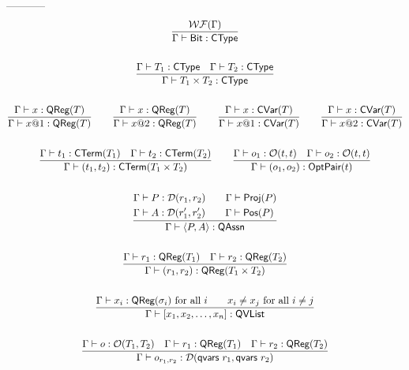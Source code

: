 -----------
\begin{gather*}
    \frac{\mathcal{WF}(\Gamma)}{\Gamma \vdash \textsf{Bit} : \textsf{CType}}
    \\
    \\
    \frac{\Gamma \vdash T_1 : \textsf{CType} \quad \Gamma \vdash T_2 : \textsf{CType}}{\Gamma \vdash T_1 \times T_2 : \textsf{CType}} \\
    \\
    \frac{\Gamma \vdash x : \textsf{QReg}(T)}{\Gamma \vdash x@1 : \textsf{QReg}(T)}
    \qquad
    \frac{\Gamma \vdash x : \textsf{QReg}(T)}{\Gamma \vdash x@2 : \textsf{QReg}(T)}
    \qquad
    \frac{\Gamma \vdash x : \textsf{CVar}(T)}{\Gamma \vdash x@1 : \textsf{CVar}(T)}
    \qquad
    \frac{\Gamma \vdash x : \textsf{CVar}(T)}{\Gamma \vdash x@2 : \textsf{CVar}(T)}
    \\
    \\
    \frac{
    \Gamma \vdash t_1 : \textsf{CTerm}(T_1) \quad \Gamma \vdash t_2 : \textsf{CTerm}(T_2)
    }
    {\Gamma \vdash (t_1, t_2) : \textsf{CTerm}(T_1 \times T_2)}
    \qquad
    \frac{\Gamma \vdash o_1 : \mathcal{O}(t, t) \quad \Gamma \vdash o_2 : \mathcal{O}(t, t)}{\Gamma \vdash (o_1, o_2) : \textsf{OptPair}(t)} \\
    \\
    \frac{
        \begin{aligned}
            & \Gamma \vdash P : \mathcal{D}(r_1, r_2) \qquad \Gamma \vdash \textsf{Proj}({P}) \\
            & \Gamma \vdash A : \mathcal{D}(r_1', r_2') \qquad \Gamma \vdash \textsf{Pos}({P})
        \end{aligned}
    }{\Gamma \vdash \langle P, A \rangle : \textsf{QAssn}} \\
    \\
    \frac{\Gamma \vdash r_1 : \textsf{QReg}(T_1) \quad \Gamma \vdash r_2 : \textsf{QReg}(T_2)}{\Gamma \vdash (r_1, r_2) : \textsf{QReg}(T_1 \times T_2)}
    \\
    \\
    \frac{\Gamma \vdash x_i : \textsf{QReg}(\sigma_i) \text{ for all } i \qquad x_i \neq x_j \text{ for all } i \neq j}{\Gamma \vdash [x_1, x_2, \dots, x_n] : \textsf{QVList}} \\
    \\
    \frac{\Gamma \vdash o : \mathcal{O}(T_1, T_2) \quad \Gamma \vdash r_1 : \textsf{QReg}(T_1) \quad \Gamma \vdash r_2 : \textsf{QReg}(T_2)}{\Gamma \vdash o_{r_1,r_2} : \mathcal{D}(\textsf{qvars}\ r_1, \textsf{qvars}\ r_2)}
\end{gather*}

